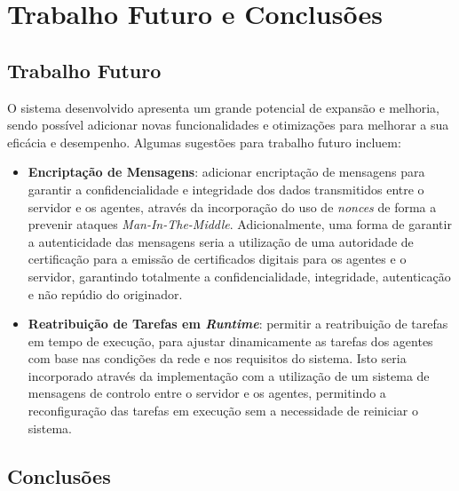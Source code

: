 \documentclass[a4paper,12pt]{scrreprt}
\begin{document}


\chapter{Trabalho Futuro e Conclusões}

\section{Trabalho Futuro}

O sistema desenvolvido apresenta um grande potencial de expansão e melhoria, sendo
possível adicionar novas funcionalidades e otimizações para melhorar a sua eficácia
e desempenho. Algumas sugestões para trabalho futuro incluem:

\begin{itemize}
    \item \textbf{Encriptação de Mensagens}: adicionar encriptação de
    mensagens para garantir a confidencialidade e integridade dos dados transmitidos entre
    o servidor e os agentes, através da incorporação do uso de \textit{nonces}
    de forma a prevenir ataques \textit{Man-In-The-Middle}. Adicionalmente, uma forma de 
    garantir a autenticidade das mensagens seria a utilização de uma autoridade de certificação
    para a emissão de certificados digitais para os agentes e o servidor, garantindo totalmente
    a confidencialidade, integridade, autenticação e não repúdio do originador.

    \item \textbf{Reatribuição de Tarefas em \textit{Runtime}}: permitir a reatribuição
    de tarefas em tempo de execução, para ajustar dinamicamente as tarefas dos agentes
    com base nas condições da rede e nos requisitos do sistema. Isto seria incorporado
    através da implementação com a utilização de um sistema de mensagens de controlo
    entre o servidor e os agentes, permitindo a reconfiguração das tarefas em execução
    sem a necessidade de reiniciar o sistema.
\end{itemize}

\section{Conclusões}
\end{document}
